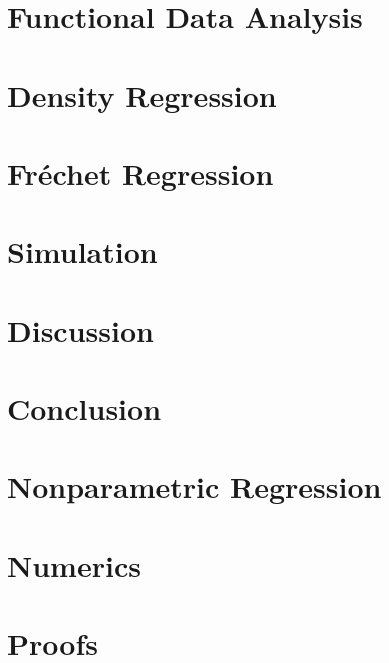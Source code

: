 \documentclass[12pt, a4paper, bibtotoc, liststotoc]{scrartcl}
\begin{document}
\section{Functional Data Analysis}
\label{sec:fda}


\section{Density Regression}
\label{sec:density regression}


\section{Fréchet Regression}
\label{sec:fréchet regression}


\section{Simulation}
\label{sec:simulation}


\section{Discussion}
\label{sec:discussion}

\section{Conclusion}
\label{sec:conclusion}





\newpage
\appendix
{}

\section{Nonparametric Regression}
\label{sec:npregression}


\section{Numerics}
\label{sec:Numerics}


\section{Proofs}
\label{sec:proofs}



\newpage

\nocite{von_gaudecker_templates_2019}
\printbibliography
\end{document}
